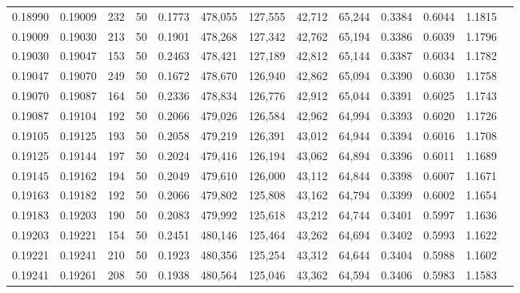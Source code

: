 \begin{tabular}{rrrrrrrrrrrrr}
0.18990 & 0.19009 &   232 &  50 &                                     0.1773 & 478,055 & 127,555 &  42,712 &  65,244 & 0.3384 & 0.6044 & 1.1815 \\
0.19009 & 0.19030 &   213 &  50 &                                     0.1901 & 478,268 & 127,342 &  42,762 &  65,194 & 0.3386 & 0.6039 & 1.1796 \\
0.19030 & 0.19047 &   153 &  50 &                                     0.2463 & 478,421 & 127,189 &  42,812 &  65,144 & 0.3387 & 0.6034 & 1.1782 \\
0.19047 & 0.19070 &   249 &  50 &                                     0.1672 & 478,670 & 126,940 &  42,862 &  65,094 & 0.3390 & 0.6030 & 1.1758 \\
0.19070 & 0.19087 &   164 &  50 &                                     0.2336 & 478,834 & 126,776 &  42,912 &  65,044 & 0.3391 & 0.6025 & 1.1743 \\
0.19087 & 0.19104 &   192 &  50 &                                     0.2066 & 479,026 & 126,584 &  42,962 &  64,994 & 0.3393 & 0.6020 & 1.1726 \\
0.19105 & 0.19125 &   193 &  50 &                                     0.2058 & 479,219 & 126,391 &  43,012 &  64,944 & 0.3394 & 0.6016 & 1.1708 \\
0.19125 & 0.19144 &   197 &  50 &                                     0.2024 & 479,416 & 126,194 &  43,062 &  64,894 & 0.3396 & 0.6011 & 1.1689 \\
0.19145 & 0.19162 &   194 &  50 &                                     0.2049 & 479,610 & 126,000 &  43,112 &  64,844 & 0.3398 & 0.6007 & 1.1671 \\
0.19163 & 0.19182 &   192 &  50 &                                     0.2066 & 479,802 & 125,808 &  43,162 &  64,794 & 0.3399 & 0.6002 & 1.1654 \\
0.19183 & 0.19203 &   190 &  50 &                                     0.2083 & 479,992 & 125,618 &  43,212 &  64,744 & 0.3401 & 0.5997 & 1.1636 \\
0.19203 & 0.19221 &   154 &  50 &                                     0.2451 & 480,146 & 125,464 &  43,262 &  64,694 & 0.3402 & 0.5993 & 1.1622 \\
0.19221 & 0.19241 &   210 &  50 &                                     0.1923 & 480,356 & 125,254 &  43,312 &  64,644 & 0.3404 & 0.5988 & 1.1602 \\
0.19241 & 0.19261 &   208 &  50 &                                     0.1938 & 480,564 & 125,046 &  43,362 &  64,594 & 0.3406 & 0.5983 & 1.1583 \\

\end{tabular}
